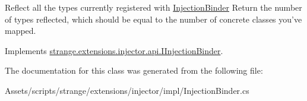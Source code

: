 Reflect all the types currently registered with \hyperlink{classstrange_1_1extensions_1_1injector_1_1impl_1_1_injection_binder}{Injection\-Binder} Return the number of types reflected, which should be equal to the number of concrete classes you've mapped. 



Implements \hyperlink{interfacestrange_1_1extensions_1_1injector_1_1api_1_1_i_injection_binder_a4f5f1efc3286ca4358d6ca9443c0f1d2}{strange.\-extensions.\-injector.\-api.\-I\-Injection\-Binder}.



The documentation for this class was generated from the following file\-:\begin{DoxyCompactItemize}
\item 
Assets/scripts/strange/extensions/injector/impl/Injection\-Binder.\-cs\end{DoxyCompactItemize}
